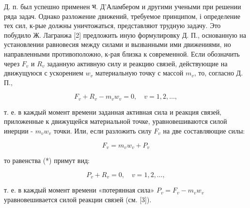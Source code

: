 \documentclass[10pt]{article}
\begin{document}
Д. п. был успешно применен भ. Д'Аламбером и другими учеными при решении ряда задач. Однако разложение движений, требуемое принципом, і определение тех сил, к-рые должны уничтожаться, представляют трудную задачу. Это побудило Ж. Лагранжа [2] предложить иную формулировку Д. П., основанную на установлении равновесия между силами и вызванными ими движениями, но направленными противоположно, к-рая близка к современной. Если обозначить через $F_{v}$ и $R_{v}$ заданную активную силу и реакцию связей, действующие на движущуюся с ускорением $w_{v}$ материальную точку с массой $m_{v}$, то, согласно Д. П.,



\[

F_{v}+R_{v}-m_{v} w_{v}=0, \quad v=1,2, \ldots,

\]



т. е. в каждый момент времени заданная активная сила и реакция связей, приложенные к движущейся материальной точке, уравновешиваются силой инерции - $m_{v} w_{v}$ точки. Или, если разложить силу $F_{v}$ на две составляющие силы:



\[

F_{v}=m_{v} w_{v}+P_{v}

\]



то равенства (*) примут вид:



\[

P_{v}+R_{v}=0, \quad v=1,2, \ldots,

\]



т. е. в каждый момент времени «потерянная сила» $P_{v}=F_{v}-m_{v} w_{v}$ уравновешивается силой реакции связей (см. [3]).
\end{document}
